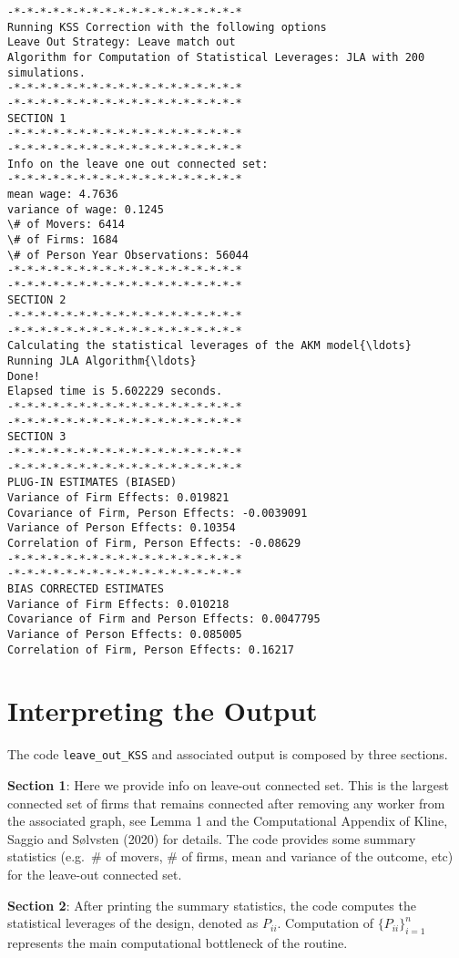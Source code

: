 \documentclass[11pt]{article}
\begin{document}
    \begin{Verbatim}[commandchars=\\\{\}]
-*-*-*-*-*-*-*-*-*-*-*-*-*-*-*-*-*-*
Running KSS Correction with the following options
Leave Out Strategy: Leave match out
Algorithm for Computation of Statistical Leverages: JLA with 200 simulations.
-*-*-*-*-*-*-*-*-*-*-*-*-*-*-*-*-*-*
-*-*-*-*-*-*-*-*-*-*-*-*-*-*-*-*-*-*
SECTION 1
-*-*-*-*-*-*-*-*-*-*-*-*-*-*-*-*-*-*
-*-*-*-*-*-*-*-*-*-*-*-*-*-*-*-*-*-*
Info on the leave one out connected set:
-*-*-*-*-*-*-*-*-*-*-*-*-*-*-*-*-*-*
mean wage: 4.7636
variance of wage: 0.1245
\# of Movers: 6414
\# of Firms: 1684
\# of Person Year Observations: 56044
-*-*-*-*-*-*-*-*-*-*-*-*-*-*-*-*-*-*
-*-*-*-*-*-*-*-*-*-*-*-*-*-*-*-*-*-*
SECTION 2
-*-*-*-*-*-*-*-*-*-*-*-*-*-*-*-*-*-*
-*-*-*-*-*-*-*-*-*-*-*-*-*-*-*-*-*-*
Calculating the statistical leverages of the AKM model{\ldots}
Running JLA Algorithm{\ldots}
Done!
Elapsed time is 5.602229 seconds.
-*-*-*-*-*-*-*-*-*-*-*-*-*-*-*-*-*-*
-*-*-*-*-*-*-*-*-*-*-*-*-*-*-*-*-*-*
SECTION 3
-*-*-*-*-*-*-*-*-*-*-*-*-*-*-*-*-*-*
-*-*-*-*-*-*-*-*-*-*-*-*-*-*-*-*-*-*
PLUG-IN ESTIMATES (BIASED)
Variance of Firm Effects: 0.019821
Covariance of Firm, Person Effects: -0.0039091
Variance of Person Effects: 0.10354
Correlation of Firm, Person Effects: -0.08629
-*-*-*-*-*-*-*-*-*-*-*-*-*-*-*-*-*-*
-*-*-*-*-*-*-*-*-*-*-*-*-*-*-*-*-*-*
BIAS CORRECTED ESTIMATES
Variance of Firm Effects: 0.010218
Covariance of Firm and Person Effects: 0.0047795
Variance of Person Effects: 0.085005
Correlation of Firm, Person Effects: 0.16217
    \end{Verbatim}

    \hypertarget{interpreting-the-output}{%
\section{Interpreting the Output}\label{interpreting-the-output}}

The code \texttt{leave\_out\_KSS} and associated output is composed by
three sections.

\textbf{Section 1}: Here we provide info on leave-out connected set.
This is the largest connected set of firms that remains connected after
removing any worker from the associated graph, see Lemma 1 and the
Computational Appendix of Kline, Saggio and Sølvsten (2020) for details.
The code provides some summary statistics (e.g.~\# of movers, \# of
firms, mean and variance of the outcome, etc) for the leave-out
connected set.

\textbf{Section 2}: After printing the summary statistics, the code
computes the statistical leverages of the design, denoted as \(P_{ii}\).
Computation of \(\{P_{ii}\}_{i=1}^{n}\) represents the main
computational bottleneck of the routine.
\end{document}

